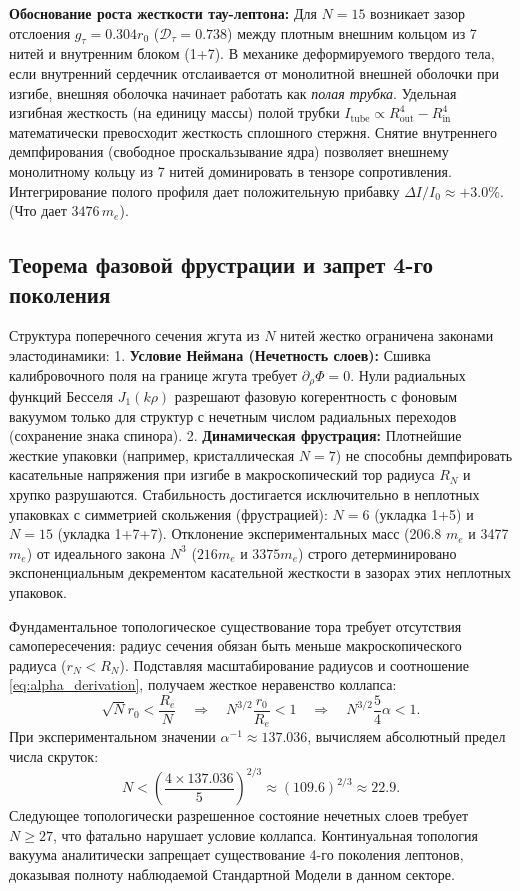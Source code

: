 \documentclass[11pt,a4paper]{article}
\begin{document}
\textbf{Обоснование роста жесткости тау-лептона:}
Для $N=15$ возникает зазор отслоения $g_\tau = 0.304 r_0$ ($\mathcal{D}_\tau = 0.738$) между плотным внешним кольцом из 7 нитей и внутренним блоком (1+7). В механике деформируемого твердого тела, если внутренний сердечник отслаивается от монолитной внешней оболочки при изгибе, внешняя оболочка начинает работать как \textit{полая трубка}. 
Удельная изгибная жесткость (на единицу массы) полой трубки $I_{\text{tube}} \propto R_{\text{out}}^4 - R_{\text{in}}^4$ математически превосходит жесткость сплошного стержня. Снятие внутреннего демпфирования (свободное проскальзывание ядра) позволяет внешнему монолитному кольцу из 7 нитей доминировать в тензоре сопротивления. Интегрирование полого профиля дает положительную прибавку $\Delta I / I_0 \approx +3.0\%$. (Что дает $3476 \, m_e$).
	
\subsection{Теорема фазовой фрустрации и запрет 4-го поколения}
Структура поперечного сечения жгута из $N$ нитей жестко ограничена законами эластодинамики:
1. \textbf{Условие Неймана (Нечетность слоев):} Сшивка калибровочного поля на границе жгута требует $\partial_\rho \Phi = 0$. Нули радиальных функций Бесселя $J_1(k\rho)$ разрешают фазовую когерентность с фоновым вакуумом только для структур с нечетным числом радиальных переходов (сохранение знака спинора).
2. \textbf{Динамическая фрустрация:} Плотнейшие жесткие упаковки (например, кристаллическая $N=7$) не способны демпфировать касательные напряжения при изгибе в макроскопический тор радиуса $R_N$ и хрупко разрушаются. Стабильность достигается исключительно в неплотных упаковках с симметрией скольжения (фрустрацией): $N=6$ (укладка 1+5) и $N=15$ (укладка 1+7+7).
Отклонение экспериментальных масс (206.8 $m_e$ и 3477 $m_e$) от идеального закона $N^3$ ($216 m_e$ и $3375 m_e$) строго детерминировано экспоненциальным декрементом касательной жесткости в зазорах этих неплотных упаковок.
	
Фундаментальное топологическое существование тора требует отсутствия самопересечения: радиус сечения обязан быть меньше макроскопического радиуса ($r_N < R_N$). Подставляя масштабирование радиусов и соотношение \eqref{eq:alpha_derivation}, получаем жесткое неравенство коллапса:
\begin{equation}
\sqrt{N} r_0 < \frac{R_e}{N} \quad \Longrightarrow \quad N^{3/2} \frac{r_0}{R_e} < 1 \quad \Longrightarrow \quad N^{3/2} \frac{5}{4}\alpha < 1.
\end{equation}
При экспериментальном значении $\alpha^{-1} \approx 137.036$, вычисляем абсолютный предел числа скруток:
\begin{equation}
N < \left( \frac{4 \times 137.036}{5} \right)^{2/3} \approx (109.6)^{2/3} \approx 22.9.
\end{equation}
Следующее топологически разрешенное состояние нечетных слоев требует $N \ge 27$, что фатально нарушает условие коллапса. Континуальная топология вакуума аналитически запрещает существование 4-го поколения лептонов, доказывая полноту наблюдаемой Стандартной Модели в данном секторе.
\end{document}
